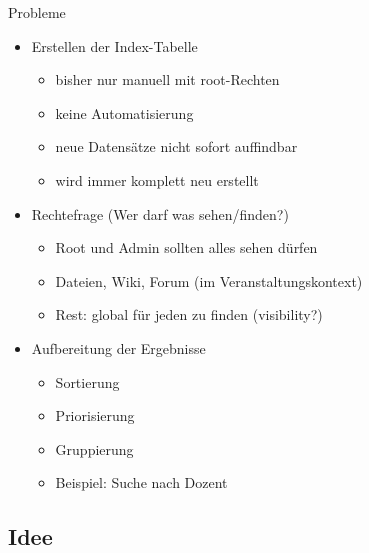 \documentclass{beamer}
\begin{document}
\begin{frame}{Probleme}
    \begin{itemize}
        \item {Erstellen der Index-Tabelle\pause}
            \begin{itemize}
                \item {bisher nur manuell mit root-Rechten}
                \item {keine Automatisierung\pause}
                \item {neue Datensätze nicht sofort auffindbar\pause}
                \item {wird immer komplett neu erstellt\pause}
            \end{itemize}
        \item {Rechtefrage (Wer darf was sehen/finden?)\pause}
            \begin{itemize}
                \item {Root und Admin sollten alles sehen dürfen\pause}
                \item {Dateien, Wiki, Forum (im Veranstaltungskontext)\pause}
                \item {Rest: global für jeden zu finden (visibility?)\pause}
            \end{itemize}
        \item {Aufbereitung der Ergebnisse\pause}
            \begin{itemize}
                \item {Sortierung}
                \item {Priorisierung\pause}
                \item {Gruppierung\pause}
                \item {Beispiel: Suche nach Dozent}
            \end{itemize}
    \end{itemize}
\end{frame}


\subsection{Idee}
\end{document}
